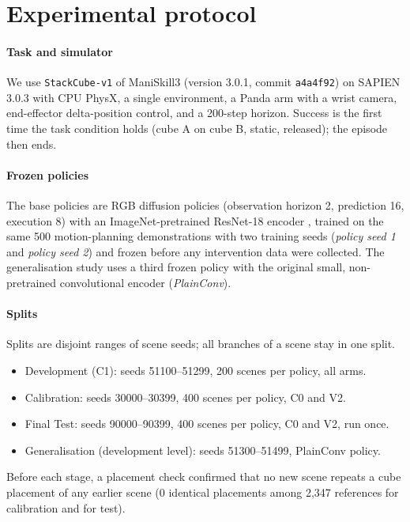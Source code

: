 \section{Experimental protocol}\label{sec:protocol}

\paragraph{Task and simulator} We use \texttt{StackCube-v1} of ManiSkill3 \cite{tao2024maniskill3} (version 3.0.1, commit \texttt{a4a4f92}) on SAPIEN 3.0.3 \cite{xiang2020sapien} with CPU PhysX, a single environment, a Panda arm with a wrist camera, end-effector delta-position control, and a 200-step horizon. Success is the first time the task condition holds (cube A on cube B, static, released); the episode then ends.

\paragraph{Frozen policies} The base policies are RGB diffusion policies \cite{chi2023diffusion} (observation horizon 2, prediction 16, execution 8) with an ImageNet-pretrained ResNet-18 encoder \cite{he2016resnet}, trained on the same 500 motion-planning demonstrations with two training seeds (\emph{policy seed 1} and \emph{policy seed 2}) and frozen before any intervention data were collected. The generalisation study uses a third frozen policy with the original small, non-pretrained convolutional encoder (\emph{PlainConv}).

\paragraph{Splits} Splits are disjoint ranges of scene seeds; all branches of a scene stay in one split.
\begin{itemize}
\item Development (C1): seeds 51100--51299, 200 scenes per policy, all arms.
\item Calibration: seeds 30000--30399, 400 scenes per policy, C0 and V2.
\item Final Test: seeds 90000--90399, 400 scenes per policy, C0 and V2, run once.
\item Generalisation (development level): seeds 51300--51499, PlainConv policy.
\end{itemize}
Before each stage, a placement check confirmed that no new scene repeats a cube placement of any earlier scene (0 identical placements among 2,347 references for calibration and for test).

